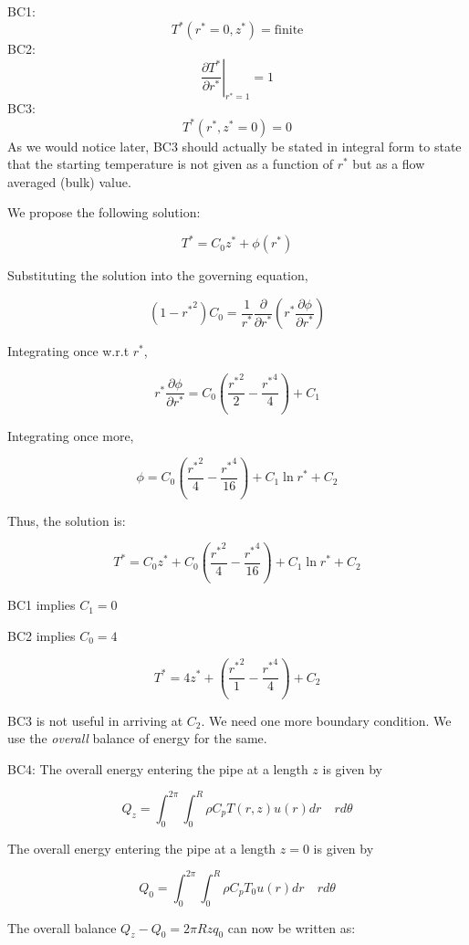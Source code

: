 BC1: $$ T^*(r^*=0, z^*) = \text{finite}$$
BC2: $$ \left. \frac{\partial T^*}{\partial r^*} \right|_{r^*=1} = 1$$
BC3: $$ T^*(r^*, z^*=0) = 0$$ As we would notice later, BC3 should actually be stated in integral form to state that the starting temperature is not given as a function of $r^*$ but as a flow averaged (bulk) value.

We propose the following solution:

$$ T^* = C_0 z^* + \phi(r^*)$$

Substituting the solution into the governing equation,

$$ (1-{r^*}^2) C_0 = \frac{1}{r^*} \frac{\partial}{\partial r^*} \left( r^* \frac{\partial \phi}{\partial r^*} \right)$$

Integrating once w.r.t $r^*$, 

$$ r^* \frac{\partial \phi}{\partial r^*}  = C_0 \left( \frac{{r^*}^2}{2} - \frac{{r^*}^4}{4}  \right) + C_1$$

Integrating once more,

$$ \phi = C_0 \left( \frac{{r^*}^2}{4} - \frac{{r^*}^4}{16}  \right) + C_1 \ln{r^*} + C_2 $$

Thus, the solution is:

\begin{equation}
\label{tsol7a}
T^* = C_0 z^* + C_0 \left( \frac{{r^*}^2}{4} - \frac{{r^*}^4}{16}  \right) + C_1 \ln{r^*} + C_2
\end{equation}


BC1 implies $C_1 = 0$

BC2 implies $C_0 = 4$

\begin{equation}
\label{tsol7b}
T^* = 4 z^* + \left( \frac{{r^*}^2}{1} - \frac{{r^*}^4}{4}  \right) +  C_2
\end{equation}

BC3 is not useful in arriving at $C_2$. We need one more boundary condition. We use the {\em overall} balance of energy for the same.

BC4: The overall energy entering the pipe at a length $z$ is given by

$$
Q_z = \int_{0}^{2\pi}{ \int_{0}^{R}{ \rho C_p T(r,z) u(r) dr}\quad rd\theta}
$$

The overall energy entering the pipe at a length $z=0$ is given by

$$
Q_0 = \int_{0}^{2\pi}{ \int_{0}^{R}{ \rho C_p T_0 u(r) dr}\quad rd\theta}
$$

The overall balance $Q_z-Q_0 = 2 \pi R z q_0$ can now be written as:

